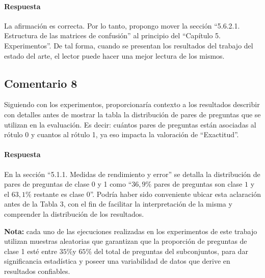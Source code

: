 \paragraph*{Respuesta}
La afirmación es correcta. Por lo tanto, propongo mover la sección ``5.6.2.1. Estructura de las matrices de confusión'' al principio del ``Capítulo 5. Experimentos''. De tal forma, cuando se presentan los resultados del trabajo del estado del arte, el lector puede hacer una mejor lectura de los mismos.

\subsection*{Comentario 8}
Siguiendo con los experimentos, proporcionaría contexto a los resultados describir con detalles antes de mostrar la tabla la distribución de pares de preguntas que se utilizan en la evaluación. Es decir: cuántos pares de preguntas están asociadas al rótulo 0 y cuantos al rótulo 1, ya eso impacta la valoración de “Exactitud”.

\paragraph*{Respuesta}
En la sección ``5.1.1. Medidas de rendimiento y error'' se detalla la distribución de pares de preguntas de clase 0 y 1 como ``\(36,9\%\) pares de preguntas son clase \(1\) y el \(63,1\%\) restante es clase \(0\)''. Podría haber sido conveniente ubicar esta aclaración antes de la Tabla 3, con el fin de facilitar la interpretación de la misma y comprender la distribución de los resultados.

\bigskip

\textbf{Nota:} cada uno de las ejecuciones realizadas en los experimentos de este trabajo utilizan muestras aleatorias que garantizan que la proporción de preguntas de clase 1 esté entre \(35\% \)y \(65\%\) del total de preguntas del subconjuntos, para dar significancia estadística y poseer una variabilidad de datos que derive en resultados confiables.

